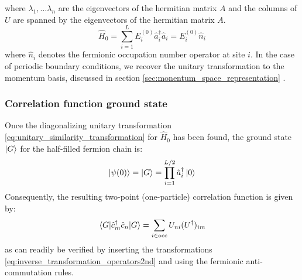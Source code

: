 \documentclass[11pt, a4paper, oneside]{book}
\theoremstyle{definition} %
\begin{document}
	 where $\lambda_1, \dots \lambda_n$ are the eigenvectors of the hermitian matrix $A$ and the columns of $U$ are spanned by the eigenvectors of the hermitian matrix $A$. 
	 \begin{equation}
	 	\hat{H}_0 = \sum_{i=1}^L E_i^{(0)} \hat{a}_i^\dagger \hat{a}_i = E_i^{(0)} \hat{n}_i 
	 \end{equation}
	 where $\hat{n}_i$ denotes the fermionic occupation number operator at site $i$. In the case of periodic boundary conditions, we recover the unitary transformation to the momentum basis, discussed in section \ref{sec:monentum_space_representation} \cite{Xueda}.
	 
\subsubsection{Correlation function ground state}
Once the diagonalizing unitary transformation \ref{eq:unitary_similarity_transformation} for $\hat{H}_0$ has been found, the ground state $\ket{G}$ for the half-filled fermion chain is:
	 \begin{equation}
	 	\ket{\psi(0)} =\ket{G} = \prod_{i=1}^{L/2} \hat{a}_i^\dagger \ket{0}
	 \end{equation}
Consequently, the resulting two-point (one-particle) correlation function is given by:
	\begin{equation}
		\mel{G}{\hat{c}_m^\dagger \hat{c}_n}{G} = \sum_{i \in \text{occ}} U_{ni} (U^\dagger)_{im}
	\end{equation}
	as can readily be verified by inserting the transformations \ref{eq:inverse_transformation_operators2nd} and using the fermionic anti-commutation rules.
	
	 
%	
%	
\end{document}
